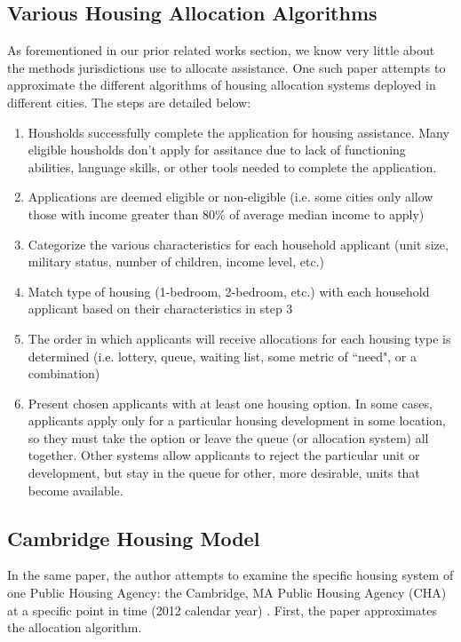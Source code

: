 \documentclass[11pt]{article}
\begin{document}
\subsection{Various Housing Allocation Algorithms}
As forementioned in our prior related works section, we know very little about the methods jurisdictions use to allocate assistance. One such paper attempts to approximate the different algorithms of housing allocation systems deployed in different cities. The steps are detailed below:
\begin{enumerate}
    \item Housholds successfully complete the application for housing assistance. Many eligible housholds don't apply for assitance due to lack of functioning abilities, language skills, or other tools needed to complete the application.
    \item Applications are deemed eligible or non-eligible (i.e. some cities only allow those with income greater than 80\% of average median income to apply)
    \item Categorize the various characteristics for each household applicant (unit size, military status, number of children, income level, etc.)
    \item Match type of housing (1-bedroom, 2-bedroom, etc.) with each household applicant based on their characteristics in step 3
    \item The order in which applicants will receive allocations for each housing type is determined (i.e. lottery, queue, waiting list, some metric of ``need", or a combination)
    \item Present chosen applicants with at least one housing option. In some cases, applicants apply only for a particular housing development in some location, so they must take the option or leave the queue (or allocation system) all together. Other systems allow applicants to reject the particular unit or development, but stay in the queue for other, more desirable, units that become available.
\end{enumerate}
\subsection{Cambridge Housing Model}
\label{sec:chm}
In the same paper, the author attempts to examine the specific housing system of one Public Housing Agency: the Cambridge, MA Public Housing Agency (CHA) at a specific point in time (2012 calendar year) \cite{nyuaffordablehousing}. First, the paper approximates the allocation algorithm.
\end{document}
